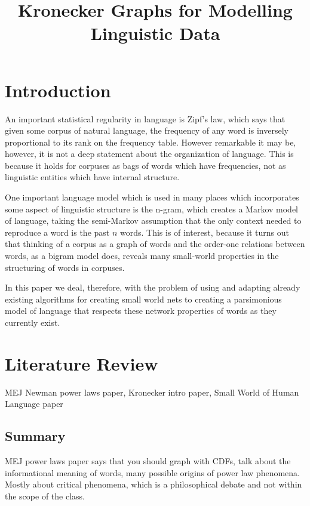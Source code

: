 \documentclass[12pt]{article}
\begin{document}
\title{Kronecker Graphs for Modelling Linguistic Data}

\section{Introduction}

An important statistical regularity in language is Zipf's law, which says that given some corpus of natural language, the frequency of any word is inversely proportional to its rank on the frequency table. However remarkable it may be, however, it is not a deep statement about the organization of language. This is because it holds for corpuses as bags of words which have frequencies, not as linguistic entities which have internal structure. %

One important language model which is used in many places which incorporates some aspect of linguistic structure is the n-gram, which creates a Markov model of language, taking the semi-Markov assumption that the only context needed to reproduce a word is the past $n$ words. This is of interest, because it turns out that thinking of a corpus as a graph of words and the order-one relations between words, as a bigram model does, reveals many small-world properties in the structuring of words in corpuses. %

In this paper we deal, therefore, with the problem of using and adapting already existing algorithms for creating small world nets to creating a parsimonious model of language that respects these network properties of words as they currently exist.


\section{Literature Review}

MEJ Newman power laws paper, Kronecker intro paper, Small World of Human Language paper

\subsection{Summary}
MEJ power laws paper says that you should graph with CDFs, talk about the informational meaning of words, many possible origins of power law phenomena. Mostly about critical phenomena, which is a philosophical debate and not within the scope of the class.
\end{document}

